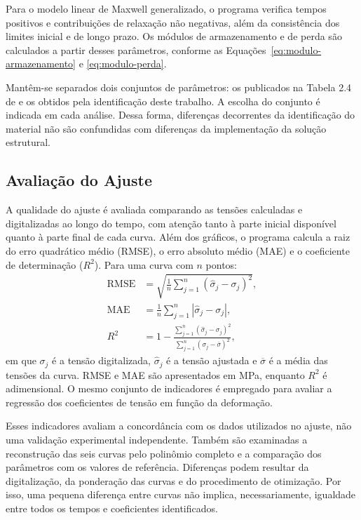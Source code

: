 \documentclass[arial,centeredequations,english,brazilian,oneside,section=TITLE]{ifes8}
\begin{document}
Para o modelo linear de Maxwell generalizado, o programa verifica
tempos positivos e contribuições de relaxação não negativas, além da consistência dos
limites inicial e de longo prazo. Os módulos de armazenamento e de perda são calculados
a partir desses parâmetros, conforme as Equações~\eqref{eq:modulo-armazenamento} e
\eqref{eq:modulo-perda}.

Mantêm-se separados dois conjuntos de parâmetros: os publicados na Tabela 2.4 de
 e os obtidos pela identificação deste trabalho. A escolha do conjunto
é indicada em cada análise. Dessa forma, diferenças decorrentes da identificação do material
não são confundidas com diferenças da implementação da solução estrutural.

\subsection{Avaliação do Ajuste}
\label{sec:avaliacao-ajuste-material}

A qualidade do ajuste é avaliada comparando as tensões calculadas e digitalizadas ao longo
do tempo, com atenção tanto à parte inicial disponível quanto à parte final de cada curva.
Além dos gráficos, o programa calcula a raiz do erro quadrático médio (RMSE), o erro absoluto
médio (MAE) e o coeficiente de determinação ($R^2$). Para uma curva com $n$ pontos:
\begin{align}
  \mathrm{RMSE}
  &=\sqrt{\frac{1}{n}\sum_{j=1}^{n}
  \left(\widehat{\sigma}_j-\sigma_j\right)^2},
  \label{eq:rmse-ajuste-material}\\
  \mathrm{MAE}
  &=\frac{1}{n}\sum_{j=1}^{n}
  \left|\widehat{\sigma}_j-\sigma_j\right|,
  \label{eq:mae-ajuste-material}\\
  R^2
  &=1-\frac{\sum_{j=1}^{n}
  \left(\widehat{\sigma}_j-\sigma_j\right)^2}
  {\sum_{j=1}^{n}\left(\sigma_j-\overline{\sigma}\right)^2},
  \label{eq:r2-ajuste-material}
\end{align}
em que $\sigma_j$ é a tensão digitalizada, $\widehat{\sigma}_j$ é a tensão ajustada e
$\overline{\sigma}$ é a média das tensões da curva. RMSE e MAE são apresentados em MPa,
enquanto $R^2$ é adimensional. O mesmo conjunto de indicadores é empregado para avaliar
a regressão dos coeficientes de tensão em função da deformação.

Esses indicadores avaliam a concordância com os dados utilizados no ajuste, não uma validação
experimental independente. Também são examinadas a reconstrução das seis curvas pelo
polinômio completo e a comparação dos parâmetros com os valores de referência. Diferenças
podem resultar da digitalização, da ponderação das curvas e do procedimento de otimização.
Por isso, uma pequena diferença entre curvas não implica, necessariamente, igualdade entre
todos os tempos e coeficientes identificados.
\end{document}
